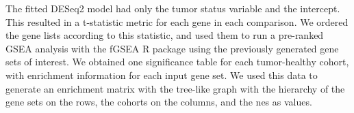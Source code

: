 
The fitted DESeq2 model had only the tumor status variable and the intercept.
This resulted in a t-statistic metric for each gene in each comparison.
We ordered the gene lists according to this statistic, and used them to run a pre-ranked GSEA analysis with the fGSEA R package \cite{korotkevichFastGeneSet2021} using the previously generated gene sets of interest.
We obtained one significance table for each tumor-healthy cohort, with enrichment information for each input gene set. We used this data to generate an enrichment matrix with the tree-like graph with the hierarchy of the gene sets on the rows, the cohorts on the columns, and the \gls{nes} as values.

